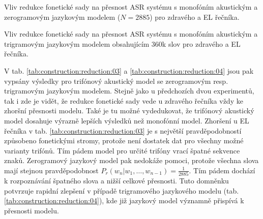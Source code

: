\begin{table}[htpb]
  \centering
  \def\arraystretch{1.5}
  \caption{Vliv redukce fonetické sady na přesnost ASR systému s monofóním akustickým a zerogramovým jazykovým modelem ($N=2885$) pro zdravého a EL řečníka.}
  \label{tab:construction:reduction:01}
\end{table}

\begin{table}[htpb]
  \centering
  \def\arraystretch{1.5}
  \caption{Vliv redukce fonetické sady na přesnost ASR systému s monofóním akustickým a trigramovým jazykovým modelem obsahujícím 360k slov pro zdravého a EL řečníka.}
  \label{tab:construction:reduction:02}
\end{table}

V tab. \ref{tab:construction:reduction:03} a \ref{tab:construction:reduction:04} jsou pak vypsány výsledky pro trifónový akustický model se zerogramovým resp. trigramovým jazykovým modelem. Stejně jako u předchozích dvou experimentů, tak i zde je vidět, že redukce fonetické sady vede u zdravého řečníka vždy ke zhoršní přesnosti modelu. Také je tu možné vydedukovat, že trifónový akustický model dosahuje výrazně lepších výsledků než monofónní model. Zhoršení u EL řečníka v tab. \ref{tab:construction:reduction:03} je s největší pravděpodobností způsobeno fonetickými stromy, protože není dostatek dat pro všechny možné varianty trifónů. Tím pádem model pro určité trifóny vrací špatné sekvence znaků. Zerogramový jazykový model pak nedokáže pomoci, protože všechna slova mají stejnou pravděpodobnost $P_r(w_n|w_1,\dots,w_{n-1}) = \frac{1}{2885}$. Tím pádem dochází k rozpoznávání špatného slova a nižší celkové přesnosti. Tuto domněnku potvrzuje rapidní zlepšení v případě trigramového jazykového modelu (tab. \ref{tab:construction:reduction:04}), kde již jazykový model významně přispívá k přesnosti modelu.

